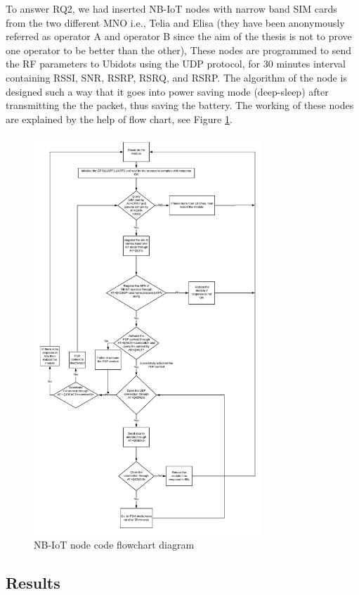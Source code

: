 \documentclass[12pt]{article}
\begin{document}
To answer RQ2, we had inserted NB-IoT nodes with narrow band SIM cards from the two different MNO i.e., Telia and Elisa (they have been anonymously referred as operator A and operator B since the aim of the thesis is not to prove one operator to be better than the other), These nodes are programmed to send the RF parameters to Ubidots using the UDP protocol, for 30 minutes interval containing RSSI, SNR, RSRP, RSRQ, and RSRP. The algorithm of the node is designed such a way that it goes into power saving mode (deep-sleep) after transmitting the the packet, thus saving the battery. The working of these nodes are explained by the help of flow chart, see Figure \ref{fig:NB-IoT node code flowchart diagram}. 


\begin{figure}[H]
    \centering
    \includegraphics[width=0.8\columnwidth,height=15cm]{nbiotFlowchart.pdf}
    \caption{NB-IoT node code flowchart diagram}
    \label{fig:NB-IoT node code flowchart diagram}
\end{figure}

\subsection{Results}\label{results}
\end{document}
